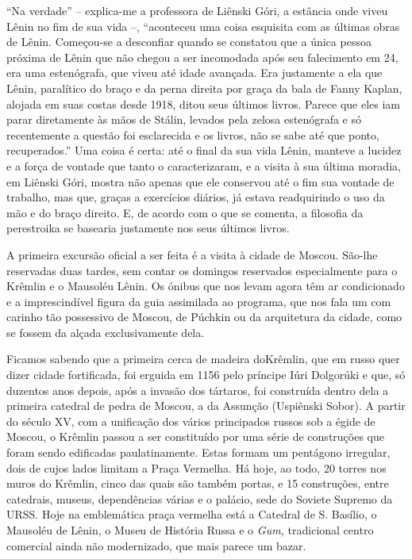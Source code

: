 ``Na verdade'' -- explica-me a professora de Liênski Góri, a estância
onde viveu Lênin no fim de sua vida --, ``aconteceu uma coisa esquisita
com as últimas obras de Lênin. Começou-se a desconfiar quando se
constatou que a única pessoa próxima de Lênin que não chegou a ser
incomodada após seu falecimento em 24, era uma estenógrafa, que viveu
até idade avançada. Era justamente a ela que Lênin, paralítico do braço
e da perna direita por graça da bala de Fanny Kaplan, alojada em suas
costas desde 1918, ditou seus últimos livros. Parece que eles iam parar
diretamente às mãos de Stálin, levados pela zelosa estenógrafa e só
recentemente a questão foi esclarecida e os livros, não se sabe até que
ponto, recuperados.'' Uma coisa é certa: até o final da sua vida Lênin,
manteve a lucidez e a força de vontade que tanto o caracterizaram, e a
visita à sua última moradia, em Liênski Góri, mostra não apenas que ele
conservou até o fim sua vontade de trabalho, mas que, graças a
exercícios diários, já estava readquirindo o uso da mão e do braço
direito. E, de acordo com o que se comenta, a filosofia da perestroika
se basearia justamente nos seus últimos livros.

A primeira excursão oficial a ser feita é a visita à cidade de Moscou.
São-lhe reservadas duas tardes, sem contar os domingos reservados
especialmente para o Krêmlin e o Mausoléu Lênin. Os ónibus que nos levam
agora têm ar condicionado e a imprescindível figura da guia assimilada
ao programa, que nos fala um com carinho tão possessivo de Moscou, de
Púchkin ou da arquitetura da cidade, como se fossem da alçada
exclusivamente dela.

Ficamos sabendo que a primeira cerca de madeira doKrêmlin, que em russo
quer dizer cidade fortificada, foi erguida em 1156 pelo príncipe Iúri
Dolgorúki e que, só duzentos anos depois, após a invasão dos tártaros,
foi construída dentro dela a primeira catedral de pedra de Moscou, a da
Assunção (Uspiênski Sobor). A partir do século XV, com a unificação dos
vários principados russos sob a égide de Moscou, o Krêmlin passou a ser
constituído por uma série de construções que foram sendo edificadas
paulatinamente. Estas formam um pentágono irregular, dois de cujos lados
limitam a Praça Vermelha. Há hoje, ao todo, 20 torres nos muros do
Krêmlin, cinco das quais são também portas, e 15 construções, entre
catedrais, museus, dependências várias e o palácio, sede do Soviete
Supremo da URSS. Hoje na emblemática praça vermelha está a Catedral de
S. Basílio, o Mausoléu de Lênin, o Museu de História Russa e o
\emph{Gum,} tradicional centro comercial ainda não modernizado, que mais
parece um bazar.

